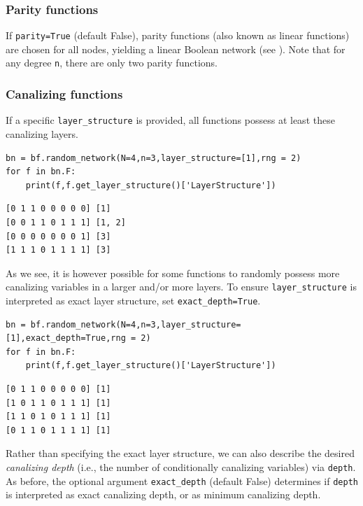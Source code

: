 \documentclass[
]{article}
\begin{document}
\subsubsection{Parity functions}\label{parity-functions-1}

If \texttt{parity=True} (default False), parity functions (also known as
linear functions) are chosen for all nodes, yielding a linear Boolean
network (see \citet{chandrasekhar2023stability}). Note that for any
degree \texttt{n}, there are only two parity functions.

\subsubsection{Canalizing functions}\label{canalizing-functions}

If a specific \texttt{layer\_structure} is provided, all functions
possess at least these canalizing layers.

\begin{lstlisting}
bn = bf.random_network(N=4,n=3,layer_structure=[1],rng = 2)
for f in bn.F:
    print(f,f.get_layer_structure()['LayerStructure'])
\end{lstlisting}

\begin{lstlisting}
[0 1 1 0 0 0 0 0] [1]
[0 0 1 1 0 1 1 1] [1, 2]
[0 0 0 0 0 0 0 1] [3]
[1 1 1 0 1 1 1 1] [3]
\end{lstlisting}

As we see, it is however possible for some functions to randomly possess
more canalizing variables in a larger and/or more layers. To ensure
\texttt{layer\_structure} is interpreted as exact layer structure, set
\texttt{exact\_depth=True}.

\begin{lstlisting}
bn = bf.random_network(N=4,n=3,layer_structure=[1],exact_depth=True,rng = 2)
for f in bn.F:
    print(f,f.get_layer_structure()['LayerStructure'])
\end{lstlisting}

\begin{lstlisting}
[0 1 1 0 0 0 0 0] [1]
[1 0 1 1 0 1 1 1] [1]
[1 1 0 1 0 1 1 1] [1]
[0 1 1 0 1 1 1 1] [1]
\end{lstlisting}

Rather than specifying the exact layer structure, we can also describe
the desired \emph{canalizing depth} (i.e., the number of conditionally
canalizing variables) via \texttt{depth}. As before, the optional
argument \texttt{exact\_depth} (default False) determines if
\texttt{depth} is interpreted as exact canalizing depth, or as minimum
canalizing depth.
\end{document}
